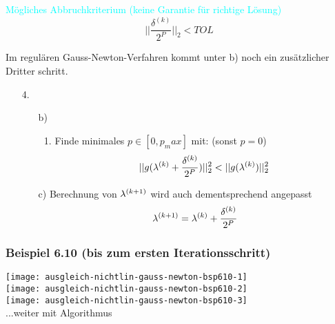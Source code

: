 \textcolor{cyan}{Mögliches Abbruchkriterium (keine Garantie für richtige Lösung)}\\
{\large
$$|| \frac{\delta^{(k)}}{2^P} ||_2 < TOL$$
}

Im regulären Gauss-Newton-Verfahren kommt unter b) noch ein zusätzlicher Dritter schritt.

	{\large
		\begin{enumerate}
			\item[4.]
				\begin{enumerate}
					\item[b)]
						\begin{enumerate}[resume=gauss-newton-inner]
							\item Finde minimales $p \in [0, p_max]$ mit: (sonst $p = 0$)
							      $$||g(\lambda^{(k)} + \frac{\delta^{(k)}}{2^P})||_2^2 < ||g(\lambda^{(k)})||_2^2$$
						\end{enumerate}
					\item[c)] Berechnung von $\lambda^{(k+1)}$ wird auch dementsprechend angepasst
						$$\lambda^{(k+1)} = \lambda^{(k)} + \frac{\delta^{(k)}}{2^P}$$
				\end{enumerate}
		\end{enumerate}
	}



\subsubsection{Beispiel 6.10 (bis zum ersten Iterationsschritt)}


\texttt{[image: ausgleich-nichtlin-gauss-newton-bsp610-1]}\\
\texttt{[image: ausgleich-nichtlin-gauss-newton-bsp610-2]}\\
\texttt{[image: ausgleich-nichtlin-gauss-newton-bsp610-3]}\\
...weiter mit Algorithmus





